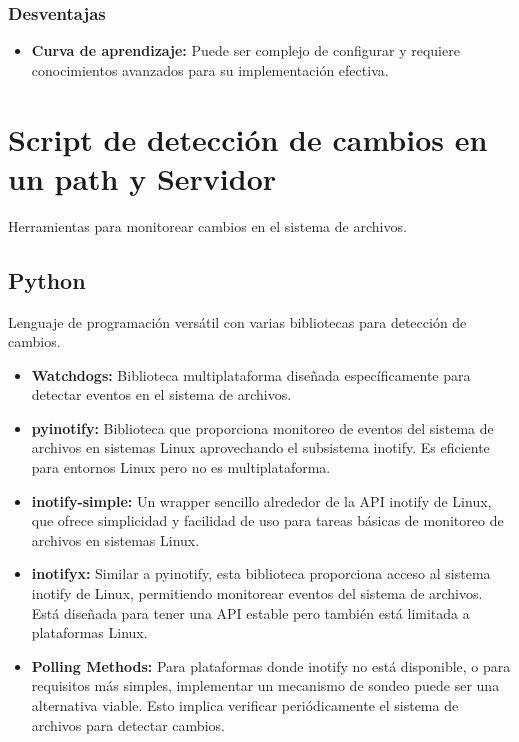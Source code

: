 \subsubsection{Desventajas}
\begin{itemize}
    \item \textbf{Curva de aprendizaje:} Puede ser complejo de configurar y requiere conocimientos avanzados para su implementación efectiva.
\end{itemize}

\clearpage
\section{Script de detección de cambios en un path y Servidor}
Herramientas para monitorear cambios en el sistema de archivos.

\subsection{Python}
Lenguaje de programación versátil con varias bibliotecas para detección de cambios.

\begin{itemize}
    \item \textbf{Watchdogs:} Biblioteca multiplataforma diseñada específicamente para detectar eventos en el sistema de archivos.
    
    \item \textbf{pyinotify:} Biblioteca que proporciona monitoreo de eventos del sistema de archivos en sistemas Linux aprovechando el subsistema inotify. Es eficiente para entornos Linux pero no es multiplataforma.
    
    \item \textbf{inotify-simple:} Un wrapper sencillo alrededor de la API inotify de Linux, que ofrece simplicidad y facilidad de uso para tareas básicas de monitoreo de archivos en sistemas Linux.
    
    \item \textbf{inotifyx:} Similar a pyinotify, esta biblioteca proporciona acceso al sistema inotify de Linux, permitiendo monitorear eventos del sistema de archivos. Está diseñada para tener una API estable pero también está limitada a plataformas Linux.
    
    \item \textbf{Polling Methods:} Para plataformas donde inotify no está disponible, o para requisitos más simples, implementar un mecanismo de sondeo puede ser una alternativa viable. Esto implica verificar periódicamente el sistema de archivos para detectar cambios.
\end{itemize}

